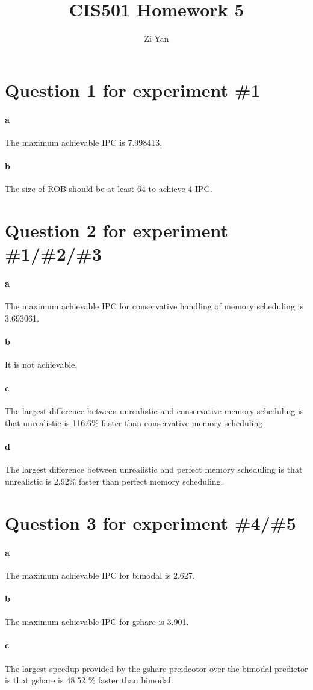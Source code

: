 \documentclass[12pt,letterpaper]{article}
\author{Zi Yan}
\date{}
\title{CIS501 Homework 5}
\begin{document}
\maketitle

\section*{Question 1 for experiment \#1}
\paragraph*{a}
The maximum achievable IPC is 7.998413.
\paragraph*{b}
The size of ROB should be at least 64 to
achieve 4 IPC.

\section*{Question 2 for experiment \#1/\#2/\#3}
\paragraph*{a}
The maximum achievable IPC for conservative handling of memory scheduling is 3.693061.
\paragraph*{b}
It is not achievable.

\paragraph*{c}
The largest difference between unrealistic
and conservative memory scheduling is 
that unrealistic is 116.6\% faster than 
conservative memory scheduling.

\paragraph*{d}
The largest difference between unrealistic
and perfect memory scheduling is that
unrealistic is 2.92\% faster than perfect 
memory scheduling.

\section*{Question 3 for experiment \#4/\#5}
\paragraph*{a}
The maximum achievable IPC for bimodal
is 2.627.
\paragraph*{b}
The maximum achievable IPC for gshare
is 3.901.
\paragraph*{c}
The largest speedup provided by the 
gshare preidcotor over the bimodal 
predictor is that gshare is 48.52 \% faster
than bimodal.
\end{document}

